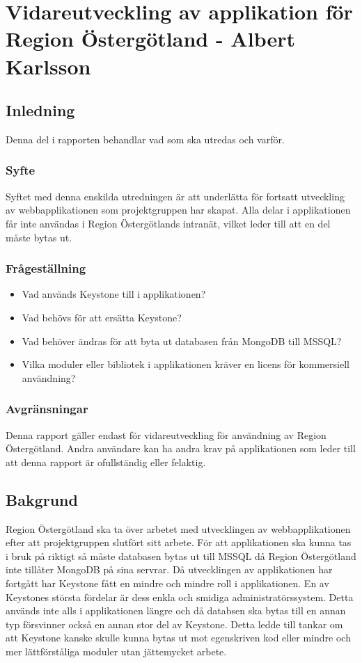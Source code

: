 \section{Vidareutveckling av applikation för Region Östergötland - Albert Karlsson}
\subsection{Inledning}
Denna del i rapporten behandlar vad som ska utredas och varför.
\subsubsection{Syfte}
Syftet med denna enskilda utredningen är att underlätta för fortsatt utveckling av webbapplikationen som projektgruppen har skapat. Alla delar i applikationen får inte användas i Region Östergötlands intranät, vilket leder till att en del måste bytas ut.
\subsubsection{Frågeställning}
\begin{itemize}
\item Vad används Keystone till i applikationen?
\item Vad behövs för att ersätta Keystone?
\item Vad behöver ändras för att byta ut databasen från MongoDB till MSSQL?
\item Vilka moduler eller bibliotek i applikationen kräver en licens för kommersiell användning?

\end{itemize}
\subsubsection{Avgränsningar}
Denna rapport gäller endast för vidareutveckling för användning av Region Östergötland. Andra användare kan ha andra krav på applikationen som leder till att denna rapport är ofullständig eller felaktig. 
\subsection{Bakgrund}
Region Östergötland ska ta över arbetet med utvecklingen av webbapplikationen efter att projektgruppen slutfört sitt arbete. För att applikationen ska kunna tas i bruk på riktigt så måste databasen bytas ut till MSSQL då Region Östergötland inte tillåter MongoDB på sina servrar. Då utvecklingen av applikationen har fortgått har Keystone fått en mindre och mindre roll i applikationen. En av Keystones största fördelar är dess enkla och smidiga administratörssystem. Detta används inte alls i applikationen längre och då databsen ska bytas till en annan typ försvinner också en annan stor del av Keystone. Detta ledde till tankar om att Keystone kanske skulle kunna bytas ut mot egenskriven kod eller mindre och mer lättförståliga moduler utan jättemycket arbete.
